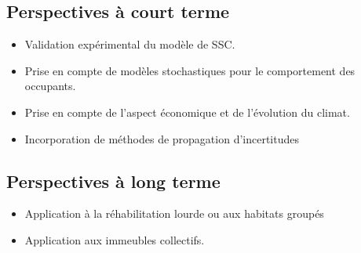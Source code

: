 \documentclass[xcolor=x11names, compress, 11pt]{beamer}
\begin{document}
\subsection{Perspectives à court terme}
\begin{frame}[c]
    \vfill
    \begin{itemize}
        \item Validation expérimental du modèle de SSC.
    \vfill
        \item Prise en compte de modèles stochastiques pour le comportement des occupants.
    \vfill
        \item Prise en compte de l’aspect économique et de l’évolution du climat.
    \vfill
        \item Incorporation de méthodes de propagation d’incertitudes
    \end{itemize}
    \vfill
\end{frame}


\subsection{Perspectives à long terme}
\begin{frame}[c]
    \vfill
    \begin{itemize}
        \item Application à la réhabilitation lourde ou aux habitats groupés
    \vfill
        \item Application aux immeubles collectifs.
    \end{itemize}
    \vfill
\end{frame}












\end{document}
